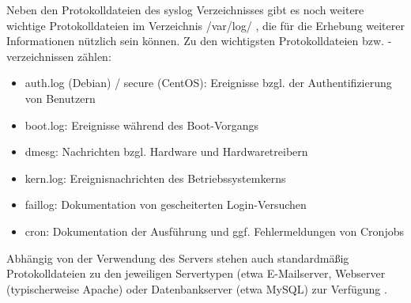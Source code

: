Neben den Protokolldateien des syslog Verzeichnisses gibt es noch weitere wichtige Protokolldateien im Verzeichnis \glqq /var/log/ \grqq , die für die Erhebung weiterer Informationen nützlich sein können. Zu den wichtigsten Protokolldateien bzw. -verzeichnissen zählen:
\begin{itemize}
\item auth.log (Debian) / secure (CentOS): Ereignisse bzgl. der Authentifizierung von Benutzern
\item boot.log: Ereignisse während des Boot-Vorgangs
\item dmesg: Nachrichten bzgl. Hardware und Hardwaretreibern
\item kern.log: Ereignisnachrichten des Betriebssystemkerns
\item faillog: Dokumentation von gescheiterten Login-Versuchen
\item cron: Dokumentation der Ausführung und ggf. Fehlermeldungen von Cronjobs
\end{itemize}

Abhängig von der Verwendung des Servers stehen auch standardmäßig Protokolldateien zu den jeweiligen Servertypen (etwa E-Mailserver, Webserver (typischerweise Apache) oder Datenbankserver (etwa MySQL) zur Verfügung \citep{Linux1,Linux4,Linux5,Linux6}.






